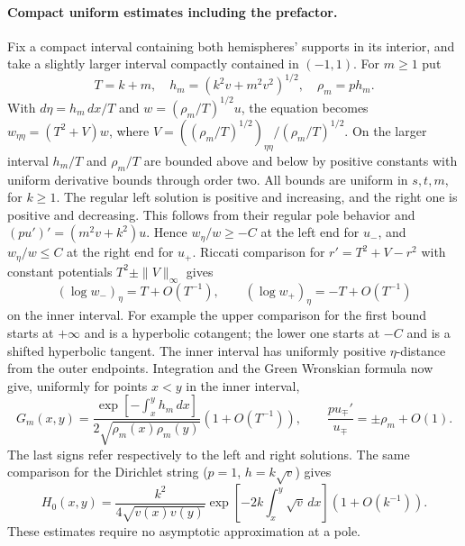 \documentclass[11pt,letterpaper]{article}
\begin{document}
\paragraph{Compact uniform estimates including the prefactor.}
Fix a compact interval containing both hemispheres' supports in its
interior, and take a slightly larger interval compactly contained in
\((-1,1)\). For \(m\geq1\) put
\[
 T=k+m,\quad h_m=(k^2v+m^2v^2)^{1/2},\quad \rho_m=p h_m .
\]
With \(d\eta=h_m\,dx/T\) and \(w=(\rho_m/T)^{1/2}u\), the equation becomes
\(w_{\eta\eta}=(T^2+V)w\), where
\(V=((\rho_m/T)^{1/2})_{\eta\eta}/(\rho_m/T)^{1/2}\).
On the larger interval \(h_m/T\) and \(\rho_m/T\) are bounded above and
below by positive constants with uniform derivative bounds through order
two. All bounds are uniform in \(s,t,m\), for \(k\geq1\).
The regular left solution is positive and increasing, and the right one
is positive and decreasing. This follows from their regular pole
behavior and \((pu')'=(m^2v+k^2)u\). Hence \(w_\eta/w\geq-C\)
at the left end for \(u_-\), and \(w_\eta/w\leq C\) at the right end
for \(u_+\). Riccati comparison for \(r'=T^2+V-r^2\) with constant
potentials \(T^2\pm\|V\|_\infty\) gives
\[
 (\log w_-)_\eta=T+O(T^{-1}),\qquad
 (\log w_+)_\eta=-T+O(T^{-1})
\]
on the inner interval. For example the upper comparison for the first
bound starts at \(+\infty\) and is a hyperbolic cotangent; the lower one
starts at \(-C\) and is a shifted hyperbolic tangent. The inner interval
has uniformly positive \(\eta\)-distance from the outer endpoints.
Integration and the Green Wronskian formula now give, uniformly for
points \(x<y\) in the inner interval,
\[
 G_m(x,y)=
 \frac{\exp[-\int_x^y h_m\,dx]}{2\sqrt{\rho_m(x)\rho_m(y)}}
 (1+O(T^{-1})),\qquad
 \frac{pu_\mp'}{u_\mp}=\pm\rho_m+O(1).
 \tag{O3}
\]
The last signs refer respectively to the left and right solutions.
The same comparison for the Dirichlet string (\(p=1\),
\(h=k\sqrt v\)) gives
\[
 H_0(x,y)=
 \frac{k^2}{4\sqrt{v(x)v(y)}}\exp[-2k\!\int_x^y\!\sqrt v\,dx]
 (1+O(k^{-1})).
 \tag{O4}
\]
These estimates require no asymptotic approximation at a pole.
\end{document}
